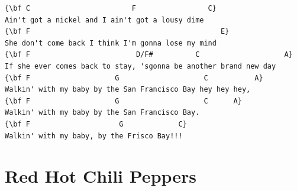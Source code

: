 \documentclass[a4paper]{article}
\begin{document}
\begin{Verbatim}[commandchars=\\\{\}]
{\bf C                        F                 C}
Ain't got a nickel and I ain't got a lousy dime
{\bf F                                             E}
She don't come back I think I'm gonna lose my mind
{\bf F                         D/F#          C                    A}
If she ever comes back to stay, 'sgonna be another brand new day
{\bf F                    G                    C           A}
Walkin' with my baby by the San Francisco Bay hey hey hey,
{\bf F                    G                    C      A}
Walkin' with my baby by the San Francisco Bay. 
{\bf F                     G             C}
Walkin' with my baby, by the Frisco Bay!!!

\end{Verbatim}
\newpage
\section{Red Hot Chili Peppers}
\end{document}
